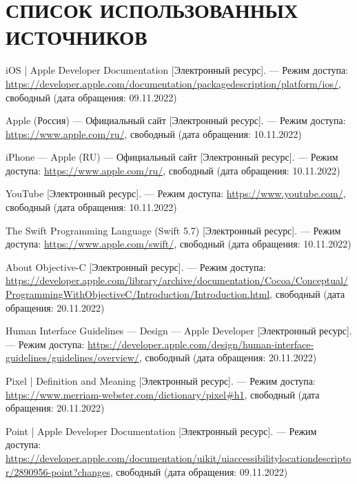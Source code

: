 \section*{СПИСОК ИСПОЛЬЗОВАННЫХ ИСТОЧНИКОВ}

\begingroup
\renewcommand{\section}[2]{}
\begin{thebibliography}{}
	
	iOS | Apple Developer Documentation [Электронный ресурс]. --- Режим доступа: \url{https://developer.apple.com/documentation/packagedescription/platform/ios/}, свободный (дата обращения: 09.11.2022)
	
	Apple (Россия) --- Официальный сайт [Электронный ресурс]. --- Режим доступа: \url{https://www.apple.com/ru/}, свободный (дата обращения: 10.11.2022)
	
	iPhone --- Apple (RU) --- Официальный сайт [Электронный ресурс]. --- Режим доступа: \url{https://www.apple.com/ru/}, свободный (дата обращения: 10.11.2022)
	
	YouTube [Электронный ресурс]. --- Режим доступа: \url{https://www.youtube.com/}, свободный (дата обращения: 10.11.2022)
	
	The Swift Programming Language (Swift 5.7) [Электронный ресурс]. --- Режим доступа: \url{https://www.apple.com/swift/}, свободный (дата обращения: 10.11.2022)
	
	About Objective-C [Электронный ресурс]. --- Режим доступа: \url{https://developer.apple.com/library/archive/documentation/Cocoa/Conceptual/ProgrammingWithObjectiveC/Introduction/Introduction.html}, свободный (дата обращения: 20.11.2022)
	
	Human Interface Guidelines --- Design --- Apple Developer [Электронный ресурс]. --- Режим доступа: \url{https://developer.apple.com/design/human-interface-guidelines/guidelines/overview/}, свободный (дата обращения: 20.11.2022)
	
	Pixel | Definition and Meaning  [Электронный ресурс]. --- Режим доступа: \url{https://www.merriam-webster.com/dictionary/pixel#h1}, свободный (дата обращения: 20.11.2022)
	
	Point | Apple Developer Documentation [Электронный ресурс]. --- Режим доступа:
	 \url{https://developer.apple.com/documentation/uikit/uiaccessibilitylocationdescriptor/2890956-point?changes}, свободный (дата обращения: 09.11.2022)
	

\end{thebibliography}
